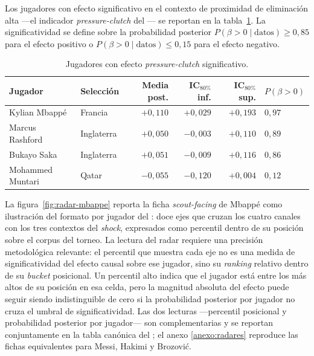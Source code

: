 Los jugadores con efecto significativo en el contexto de proximidad
de eliminación alta ---el indicador \textit{pressure-clutch} del
\CCV--- se reportan en la tabla~\ref{tab:pressure-clutch}. La
significatividad se define sobre la probabilidad posterior
$P(\beta > 0 \mid \text{datos}) \geq 0{,}85$ para el efecto positivo
o $P(\beta > 0 \mid \text{datos}) \leq 0{,}15$ para el efecto
negativo.

\begin{table}[h]
  \centering
  \small
  \caption{Jugadores con efecto \textit{pressure-clutch} significativo.}
  \label{tab:pressure-clutch}
  \begin{tabular}{llrrrl}
    \toprule
    Jugador & Selección & Media post. & IC$_{80\%}$ inf. & IC$_{80\%}$ sup. & $P(\beta>0)$ \\
    \midrule
    Kylian Mbappé   & Francia    & $+0{,}110$ & $+0{,}029$ & $+0{,}193$ & $0{,}97$ \\
    Marcus Rashford & Inglaterra & $+0{,}050$ & $-0{,}003$ & $+0{,}110$ & $0{,}89$ \\
    Bukayo Saka     & Inglaterra & $+0{,}051$ & $-0{,}009$ & $+0{,}116$ & $0{,}86$ \\
    \midrule
    Mohammed Muntari & Qatar     & $-0{,}055$ & $-0{,}120$ & $+0{,}004$ & $0{,}12$ \\
    \bottomrule
  \end{tabular}
\end{table}

La figura~\ref{fig:radar-mbappe} reporta la ficha
\textit{scout-facing} de Mbappé como ilustración del formato por
jugador del \CCV: doce ejes que cruzan los cuatro canales con los
tres contextos del \textit{shock}, expresados como percentil dentro
de su posición sobre el corpus del torneo. La lectura del radar
requiere una precisión metodológica relevante: el percentil que
muestra cada eje no es una medida de significatividad del efecto
causal sobre ese jugador, sino su \textit{ranking} relativo dentro
de su \textit{bucket} posicional. Un percentil alto indica que el
jugador está entre los más altos de su posición en esa celda, pero
la magnitud absoluta del efecto puede seguir siendo indistinguible
de cero si la probabilidad posterior por jugador no cruza el umbral
de significatividad. Las dos lecturas ---percentil posicional y
probabilidad posterior por jugador--- son complementarias y se
reportan conjuntamente en la tabla canónica del \CCV; el anexo
\ref{anexo:radares} reproduce las fichas equivalentes para Messi,
Hakimi y Brozović.

